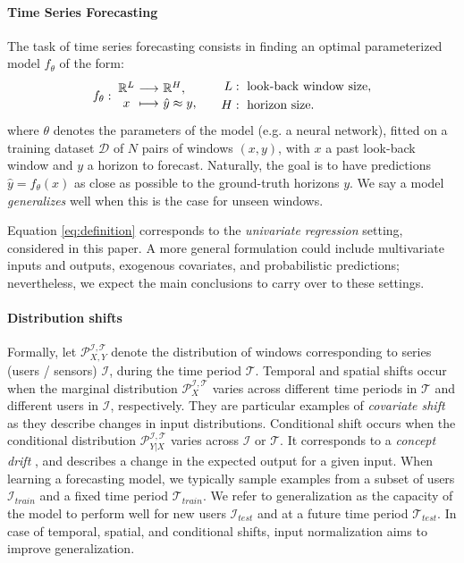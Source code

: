 \paragraph{Time Series Forecasting} The task of time series forecasting consists in finding an optimal parameterized model $f_\theta$ of the form:
\begin{equation}
\label{eq:definition}
f_\theta:\;
\begin{array}{@{}c@{~}c@{~}l@{}}
  \mathbb{R}^{L} & \longrightarrow & \mathbb{R}^{H}, \\
x & \longmapsto & \hat{y} \approx y,
\end{array}
\qquad
\begin{aligned}
L &:\ \text{look-back window size},\\
H &:\ \text{horizon size}.
\end{aligned}
\end{equation}
where $\theta$ denotes the parameters of the model (e.g. a neural network), fitted on a training dataset $\mathcal{D}$ of $N$ pairs of windows $(x, y)$, with $x$ a past look-back window and $y$ a horizon to forecast. Naturally, the goal is to have predictions $\hat{y}=f_{\theta}(x)$ as close as possible to the ground-truth horizons $y$. We say a model \textit{generalizes} well when this is the case for unseen windows.

Equation \ref{eq:definition} corresponds to the \textit{univariate regression} setting, considered in this paper. A more general formulation could include multivariate inputs and outputs, exogenous covariates, and probabilistic predictions; nevertheless, we expect the main conclusions to carry over to these settings.

\paragraph{Distribution shifts}
Formally, let $\mathcal{P}^{\mathcal{I},\mathcal{T}}_{X,Y}$ denote the distribution of windows corresponding to series (users / sensors) $\mathcal{I}$, during the time period $\mathcal{T}$. Temporal and spatial shifts occur when the marginal distribution $\mathcal{P}^{\mathcal{I},\mathcal{T}}_{X}$ varies across different time periods in $\mathcal{T}$ and different users in $\mathcal{I}$, respectively. They are particular examples of \textit{covariate shift} \citep{kairouz2021advances} as they describe changes in input distributions. Conditional shift occurs when the conditional distribution
$\mathcal{P}^{\mathcal{I},\mathcal{T}}_{Y|X}$ varies across $\mathcal{I}$ or $\mathcal{T}$.  It corresponds to a \textit{concept drift} \citep{moreno2012unifying}, and describes a change in the expected output for a given input. When learning a forecasting model, we typically sample examples from a subset of users $\mathcal{I}_{train}$ and a fixed time period $\mathcal{T}_{train}$. We refer to generalization as the capacity of the model to perform well for new users $\mathcal{I}_{test}$ and at a future time period $\mathcal{T}_{test}$. In case of temporal, spatial, and conditional shifts, input normalization aims to improve generalization.
